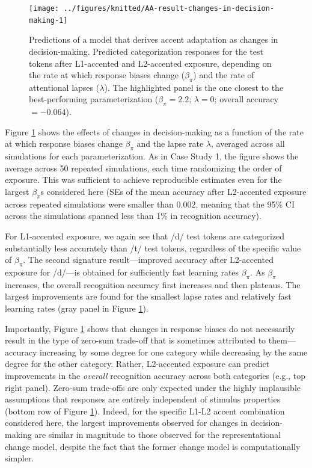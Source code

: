 \documentclass[
  11pt,
  man,floatsintext]{apa6}
\begin{document}
\begin{figure}

{\centering \texttt{[image: ../figures/knitted/AA-result-changes-in-decision-making-1]} 

}

\caption{Predictions of a model that derives accent adaptation as changes in decision-making. Predicted categorization responses for the test tokens after L1-accented and L2-accented exposure, depending on the rate at which response biases change (\(\beta_{\pi}\)) and the rate of attentional lapses (\(\lambda\)). The highlighted panel is the one closest to the best-performing parameterization (\(\beta_{\pi} = 2.2\); \(\lambda=0\); overall accuracy\(=-0.064\)).}\label{fig:AA-result-changes-in-decision-making}
\end{figure}

Figure \ref{fig:AA-result-changes-in-decision-making} shows the effects of changes in decision-making as a function of the rate at which response biases change \(\beta_{\pi}\) and the lapse rate \(\lambda\), averaged across all simulations for each parameterization. As in Case Study 1, the figure shows the average across 50 repeated simulations, each time randomizing the order of exposure. This was sufficient to achieve reproducible estimates even for the largest \(\beta_{\pi}\)s considered here (SEs of the mean accuracy after L2-accented exposure across repeated simulations were smaller than \(0.002\), meaning that the 95\% CI across the simulations spanned less than 1\% in recognition accuracy).

For L1-accented exposure, we again see that /d/ test tokens are categorized substantially less accurately than /t/ test tokens, regardless of the specific value of \(\beta_{\pi}\). The second signature result---improved accuracy after L2-accented exposure for /d/---is obtained for sufficiently fast learning rates \(\beta_{\pi}\). As \(\beta_{\pi}\) increases, the overall recognition accuracy first increases and then plateaus. The largest improvements are found for the smallest lapse rates and relatively fast learning rates (gray panel in Figure \ref{fig:AA-result-changes-in-decision-making}).

Importantly, Figure \ref{fig:AA-result-changes-in-decision-making} shows that changes in response biases do not necessarily result in the type of zero-sum trade-off that is sometimes attributed to them---accuracy increasing by some degree for one category while decreasing by the same degree for the other category. Rather, L2-accented exposure can predict improvements in the \emph{overall} recognition accuracy across both categories (e.g., top right panel). Zero-sum trade-offs are only expected under the highly implausible assumptions that responses are entirely independent of stimulus properties (bottom row of Figure \ref{fig:AA-result-changes-in-decision-making}). Indeed, for the specific L1-L2 accent combination considered here, the largest improvements observed for changes in decision-making are similar in magnitude to those observed for the representational change model, despite the fact that the former change model is computationally simpler.
\end{document}
